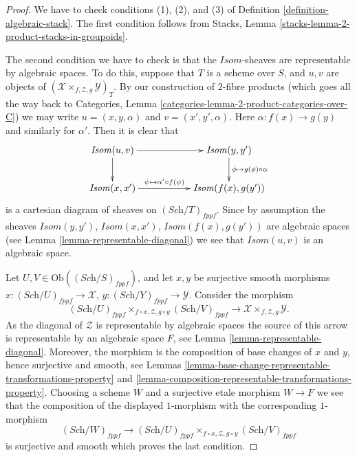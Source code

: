 \begin{proof}
We have to check conditions (1), (2), and (3) of
Definition \ref{definition-algebraic-stack}.
The first condition follows from
Stacks, Lemma \ref{stacks-lemma-2-product-stacks-in-groupoids}.

\medskip\noindent
The second condition we have to check is that the $\mathit{Isom}$-sheaves
are representable by algebraic spaces. To do this, suppose that
$T$ is a scheme over $S$, and $u, v$ are objects of
$(\mathcal{X} \times_{f, \mathcal{Z}, g} \mathcal{Y})_T$.
By our construction of $2$-fibre products (which goes all the way
back to
Categories, Lemma \ref{categories-lemma-2-product-categories-over-C})
we may write $u = (x, y, \alpha)$ and $v = (x', y', \alpha)$.
Here $\alpha : f(x) \to g(y)$ and similarly for $\alpha'$.
Then it is clear that
$$
\xymatrix{
\mathit{Isom}(u, v) \ar[d] \ar[rr] & &
\mathit{Isom}(y, y') \ar[d]^{\phi \mapsto g(\phi) \circ \alpha} \\
\mathit{Isom}(x, x') \ar[rr]^-{\psi \mapsto \alpha' \circ f(\psi)} & &
\mathit{Isom}(f(x), g(y'))
}
$$
is a cartesian diagram of sheaves on $(\textit{Sch}/T)_{fppf}$.
Since by assumption the sheaves
$\mathit{Isom}(y, y')$, $\mathit{Isom}(x, x')$, $\mathit{Isom}(f(x), g(y'))$
are algebraic spaces (see
Lemma \ref{lemma-representable-diagonal})
we see that $\mathit{Isom}(u, v)$
is an algebraic space.

\medskip\noindent
Let $U, V \in \text{Ob}((\textit{Sch}/S)_{fppf})$,
and let $x, y$ be surjective smooth morphisms
$x : (\textit{Sch}/U)_{fppf} \to \mathcal{X}$,
$y : (\textit{Sch}/Y)_{fppf} \to \mathcal{Y}$.
Consider the morphism
$$
(\textit{Sch}/U)_{fppf}
\times_{f \circ x, \mathcal{Z}, g \circ y}
(\textit{Sch}/V)_{fppf}
\longrightarrow
\mathcal{X} \times_{f, \mathcal{Z}, g} \mathcal{Y}.
$$
As the diagonal of $\mathcal{Z}$ is representable by algebraic spaces
the source of this arrow is representable by an algebraic space $F$, see
Lemma \ref{lemma-representable-diagonal}.
Moreover, the morphism is the composition
of base changes of $x$ and $y$, hence surjective and smooth, see
Lemmas \ref{lemma-base-change-representable-transformations-property} and
\ref{lemma-composition-representable-transformations-property}.
Choosing a scheme $W$ and a surjective etale morphism $W \to F$
we see that the composition of the displayed $1$-morphism
with the corresponding $1$-morphism
$$
(\textit{Sch}/W)_{fppf}
\longrightarrow
(\textit{Sch}/U)_{fppf}
\times_{f \circ x, \mathcal{Z}, g \circ y}
(\textit{Sch}/V)_{fppf}
$$
is surjective and smooth which proves the last condition.
\end{proof}

